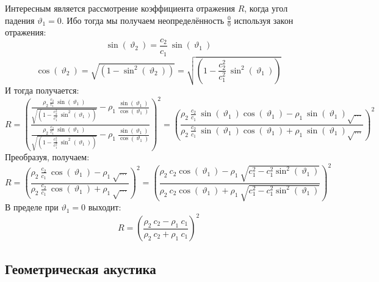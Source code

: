 \documentclass[14pt,a4paper,oneside]{extarticle}	%
\newcommand{\bracket}[1] {\left( #1 \right) } %
\begin{document}
Интересным является рассмотрение коэффициента отражения $ R $, когда угол падения  $ \vartheta_{1} = 0 $.
Ибо тогда мы получаем неопределённость $ \frac{0}{0} $ используя закон отражения:
\begin{equation*}
\sin(\: \vartheta_{2}\:) = \frac{c_{2}}{c_{1}}\:\sin(\: \vartheta_{1}\:)
\end{equation*}
\begin{equation*}
\cos(\: \vartheta_{2}\:) = \sqrt{\bracket{1 - \sin^{2}(\: \vartheta_{2}\:) }} = \sqrt{\bracket{1 - \frac{c_{2}^{2}}{c_{1}^{2}}\:\sin^{2}(\: \vartheta_{1}\:) }}
\end{equation*}
И тогда получается:
\begin{equation*}
R = \bracket{\frac{\frac{\rho_{2}\:\frac{c_{2}}{c_{1}}\:\sin(\: \vartheta_{1}\:)}{\sqrt{\bracket{1 - \frac{c_{2}^{2}}{c_{1}^{2}}\:\sin^{2}(\: \vartheta_{1}\:) }}} - \rho_{1}\:\frac{\sin(\:\vartheta_{1}\:)}{\cos(\:\vartheta_{1}\:)}}{\frac{\rho_{2}\:\frac{c_{2}}{c_{1}}\:\sin(\: \vartheta_{1}\:)}{\sqrt{\bracket{1 - \frac{c_{2}^{2}}{c_{1}^{2}}\:\sin^{2}(\: \vartheta_{1}\:) }}} - \rho_{1}\:\frac{\sin(\:\vartheta_{1}\:)}{\cos(\:\vartheta_{1}\:)}}}^{2} = \bracket{\frac{\rho_{2}\:\frac{c_{2}}{c_{1}}\:\sin(\: \vartheta_{1}\:)\cos(\: \vartheta_{1}\:) - \rho_{1}\:\sin(\: \vartheta_{1}\:)\sqrt{...}}{\rho_{2}\:\frac{c_{2}}{c_{1}}\:\sin(\: \vartheta_{1}\:)\cos(\: \vartheta_{1}\:) + \rho_{1}\:\sin(\: \vartheta_{1}\:)\sqrt{...}}}^{2}
\end{equation*}
Преобразуя, получаем:
\begin{equation*}
R = \bracket{\frac{\rho_{2}\:\frac{c_{2}}{c_{1}}\:\cos(\: \vartheta_{1}\:) - \rho_{1}\:\sqrt{...}}{\rho_{2}\:\frac{c_{2}}{c_{1}}\:\cos(\: \vartheta_{1}\:) + \rho_{1}\:\sqrt{...}}}^{2}  =\bracket{\frac{\rho_{2}\:c_{2}\cos(\:\vartheta_{1}\:) - \rho_{1}\:\sqrt{c^{2}_{1}-c^{2}_{1}\sin^{2}(\: \vartheta_{1}\:) }}{\rho_{2}\:c_{2}\cos(\:\vartheta_{1}\:) + \rho_{1}\:\sqrt{c^{2}_{1}-c^{2}_{1}\sin^{2}(\: \vartheta_{1}\:) }}}^{2} 
\end{equation*}
В пределе при $ \vartheta_{1} = 0 $ выходит:
\begin{equation*}
R =\bracket{\frac{\rho_{2}\:c_{2} - \rho_{1}\:c_{1}}{\rho_{2}\:c_{2} + \rho_{1}\:c_{1}}}^{2} 
\end{equation*}
\newpage
\begin{center}
	\subsection*{Геометрическая акустика} %
\end{center}
\end{document}
